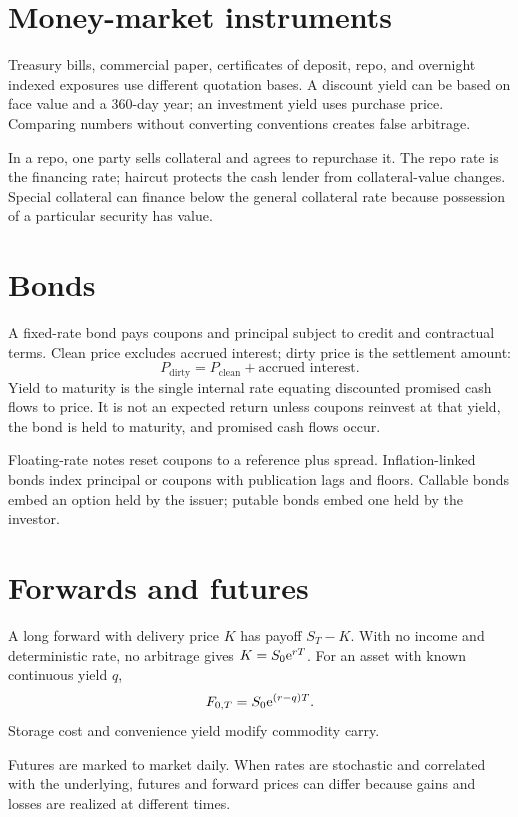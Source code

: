 \section{Money-market instruments}

Treasury bills, commercial paper, certificates of deposit, repo, and overnight
indexed exposures use different quotation bases. A discount yield can be based on
face value and a 360-day year; an investment yield uses purchase price. Comparing
numbers without converting conventions creates false arbitrage.

In a repo, one party sells collateral and agrees to repurchase it. The repo rate is
the financing rate; haircut protects the cash lender from collateral-value changes.
Special collateral can finance below the general collateral rate because possession
of a particular security has value.

\section{Bonds}

A fixed-rate bond pays coupons and principal subject to credit and contractual terms.
Clean price excludes accrued interest; dirty price is the settlement amount:
\[
P_{\mathrm{dirty}}=P_{\mathrm{clean}}+\text{accrued interest}.
\]
Yield to maturity is the single internal rate equating discounted promised cash
flows to price. It is not an expected return unless coupons reinvest at that yield,
the bond is held to maturity, and promised cash flows occur.

Floating-rate notes reset coupons to a reference plus spread. Inflation-linked bonds
index principal or coupons with publication lags and floors. Callable bonds embed an
option held by the issuer; putable bonds embed one held by the investor.

\section{Forwards and futures}

A long forward with delivery price $K$ has payoff $S_T-K$. With no income and
deterministic rate, no arbitrage gives $K=S_0\mathrm e^{rT}$. For an asset with known
continuous yield $q$,
\[
F_{0,T}=S_0\mathrm e^{(r-q)T}.
\]
Storage cost and convenience yield modify commodity carry.

Futures are marked to market daily. When rates are stochastic and correlated with
the underlying, futures and forward prices can differ because gains and losses are
realized at different times.

